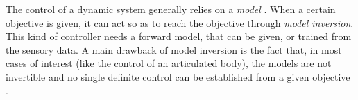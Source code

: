 \documentclass[runningheads]{llncs}
\begin{document}





The control of a dynamic system generally relies on a \emph{model} \cite{miall1996forward}. 
When a certain objective is given, it can 
act so as to reach the objective through \emph{model inversion}.
This kind of controller needs a forward model, that can be given, or trained from 
the sensory data. %
A main drawback of model inversion is the fact that, in most cases of interest (like the control of an articulated body), the models are not invertible and no single definite control can be established from a given objective \cite{jordan1992forward}. 
\end{document}
